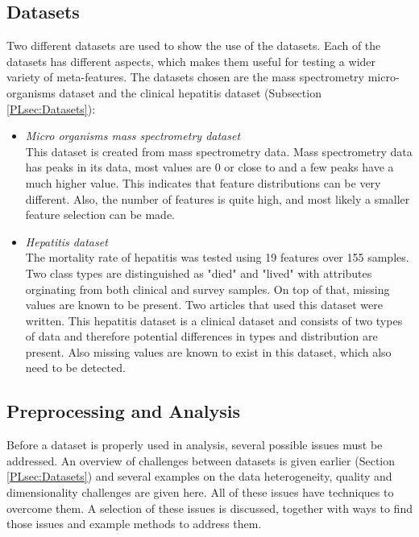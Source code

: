 \documentclass[10pt,a4paper]{report}
\begin{document}
	\subsection{Datasets}
	\label{DEsubsec:Datasets}
	
	Two different datasets are used to show the use of the datasets. Each of the datasets has different aspects, which makes them useful for testing a wider variety of meta-features. The datasets chosen are the mass spectrometry micro-organisms dataset and the clinical hepatitis dataset (Subsection \ref{PLsec:Datasets}):
	
	\begin{itemize}
		\item %
		\textit{Micro organisms mass spectrometry dataset} \\ 
		This dataset is created from mass spectrometry data. Mass spectrometry data has peaks in its data, most values are 0 or close to and a few peaks have a much higher value. This indicates that feature distributions can be very different. Also, the number of features is quite high, and most likely a smaller feature selection can be made.
		\item \textit{Hepatitis dataset} \\ The mortality rate of hepatitis was tested using 19 features over 155 samples. Two class types are distinguished as "died" and "lived" with attributes orginating from both clinical and survey samples. On top of that, missing values are known to be present. Two articles that used this dataset were written\cite{diaconis1983computer, cestnikkononenkoj}.
		This hepatitis dataset is a clinical dataset and consists of two types of data and therefore potential differences in types and distribution are present. Also missing values are known to exist in this dataset, which also need to be detected.
	\end{itemize}
	
	\subsection{Preprocessing and Analysis}
	\label{DEsubsec:Preprocessing}
	
	Before a dataset is properly used in analysis, several possible issues must be addressed. An overview of challenges between datasets is given earlier (Section \ref{PLsec:Datasets}) and several examples on the data heterogeneity, quality and dimensionality challenges are given here. All of these issues have techniques to overcome them. A selection of these issues is discussed, together with ways to find those issues and example methods to address them.
	
\end{document}
